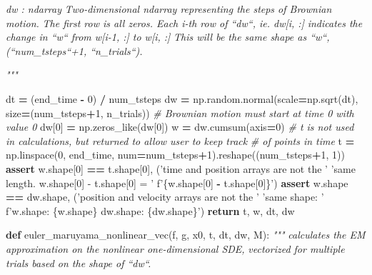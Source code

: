 \documentclass[]{article}
\newenvironment{Shaded}{\begin{snugshade}}{\end{snugshade}}
\newcommand{\CommentTok}[1]{\textcolor[rgb]{0.56,0.35,0.01}{\textit{#1}}}
\newcommand{\ControlFlowTok}[1]{\textcolor[rgb]{0.13,0.29,0.53}{\textbf{#1}}}
\newcommand{\DecValTok}[1]{\textcolor[rgb]{0.00,0.00,0.81}{#1}}
\newcommand{\KeywordTok}[1]{\textcolor[rgb]{0.13,0.29,0.53}{\textbf{#1}}}
\newcommand{\NormalTok}[1]{#1}
\newcommand{\OperatorTok}[1]{\textcolor[rgb]{0.81,0.36,0.00}{\textbf{#1}}}
\newcommand{\SpecialCharTok}[1]{\textcolor[rgb]{0.00,0.00,0.00}{#1}}
\newcommand{\SpecialStringTok}[1]{\textcolor[rgb]{0.31,0.60,0.02}{#1}}
\newcommand{\StringTok}[1]{\textcolor[rgb]{0.31,0.60,0.02}{#1}}
\begin{document}
\begin{Shaded}
\begin{Highlighting}[]
\CommentTok{    dw : ndarray}
\CommentTok{        Two-dimensional ndarray representing the steps of Brownian motion.}
\CommentTok{        The first row is all zeros. Each i-th row of ``dw``, ie. dw[i, :]}
\CommentTok{        indicates the change in ``w`` from w[i-1, :] to w[i, :]}
\CommentTok{        This will be the same shape as ``w``, (``num_tsteps``+1, ``n_trials``).}

\CommentTok{    """}

\NormalTok{    dt }\OperatorTok{=}\NormalTok{ (end_time }\OperatorTok{-} \DecValTok{0}\NormalTok{) }\OperatorTok{/}\NormalTok{ num_tsteps}
\NormalTok{    dw }\OperatorTok{=}\NormalTok{ np.random.normal(scale}\OperatorTok{=}\NormalTok{np.sqrt(dt), size}\OperatorTok{=}\NormalTok{(num_tsteps}\OperatorTok{+}\DecValTok{1}\NormalTok{, n_trials))}
    \CommentTok{# Brownian motion must start at time 0 with value 0}
\NormalTok{    dw[}\DecValTok{0}\NormalTok{] }\OperatorTok{=}\NormalTok{ np.zeros_like(dw[}\DecValTok{0}\NormalTok{])}
\NormalTok{    w }\OperatorTok{=}\NormalTok{ dw.cumsum(axis}\OperatorTok{=}\DecValTok{0}\NormalTok{)}
    \CommentTok{# t is not used in calculations, but returned to allow user to keep track}
    \CommentTok{# of points in time}
\NormalTok{    t }\OperatorTok{=}\NormalTok{ np.linspace(}\DecValTok{0}\NormalTok{, end_time, num}\OperatorTok{=}\NormalTok{num_tsteps}\OperatorTok{+}\DecValTok{1}\NormalTok{).reshape((num_tsteps}\OperatorTok{+}\DecValTok{1}\NormalTok{, }\DecValTok{1}\NormalTok{))}
    \ControlFlowTok{assert}\NormalTok{ w.shape[}\DecValTok{0}\NormalTok{] }\OperatorTok{==}\NormalTok{ t.shape[}\DecValTok{0}\NormalTok{], (}\StringTok{'time and position arrays are not the '}
                                      \StringTok{'same length. w.shape[0] - t.shape[0] = '}
                                      \SpecialStringTok{f'}\SpecialCharTok{\{w.}\NormalTok{shape[}\DecValTok{0}\NormalTok{] }\OperatorTok{-} \SpecialCharTok{t.}\NormalTok{shape[}\DecValTok{0}\NormalTok{]}\SpecialCharTok{\}}\SpecialStringTok{'}\NormalTok{)}
    \ControlFlowTok{assert}\NormalTok{ w.shape }\OperatorTok{==}\NormalTok{ dw.shape, (}\StringTok{'position and velocity arrays are not the '}
                                 \StringTok{'same shape: '}
                                 \SpecialStringTok{f'w.shape: }\SpecialCharTok{\{w.}\NormalTok{shape}\SpecialCharTok{\}}\SpecialStringTok{    dw.shape: }\SpecialCharTok{\{dw.}\NormalTok{shape}\SpecialCharTok{\}}\SpecialStringTok{'}\NormalTok{)}
    \ControlFlowTok{return}\NormalTok{ t, w, dt, dw}


\KeywordTok{def}\NormalTok{ euler_maruyama_nonlinear_vec(f, g, x0, t, dt, dw, M):}
    \CommentTok{"""}
\CommentTok{    calculates the EM approximation on the nonlinear one-dimensional SDE,}
\CommentTok{    vectorized for multiple trials based on the shape of ``dw``.}


\end{Highlighting}
\end{Shaded}
\end{document}
